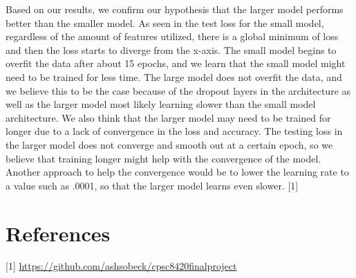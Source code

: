 \documentclass{article}
\begin{document}
Based on our results, we confirm our hypothesis that the larger model performs better than the smaller model. As seen in the test loss for the small model, regardless of the amount of features utilized, there is a global minimum of loss and then the loss starts to diverge from the x-axis. The small model begins to overfit the data after about 15 epochs, and we learn that the small model might need to be trained for less time. The large model does not overfit the data, and we believe this to be the case because of the dropout layers in the architecture as well as the larger model most likely learning slower than the small model architecture. We also think that the larger model may need to be trained for longer due to a lack of convergence in the loss and accuracy. The testing loss in the larger model does not converge and smooth out at a certain epoch, so we believe that training longer might help with the convergence of the model. Another approach to help the convergence would be to lower the learning rate to a value such as .0001, so that the larger model learns even slower. [1]

\section{References}
[1] \url{https://github.com/ashsobeck/cpsc8420finalproject}
\end{document}
